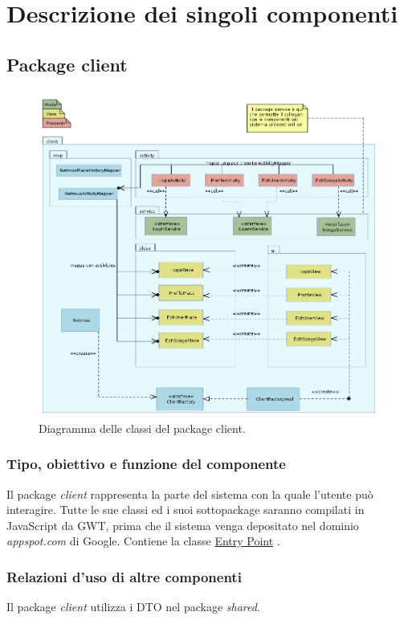 \chapter{Descrizione dei singoli componenti}
\section{Package client}
\begin{figure}[h]
  \centering
  \includegraphics[width=16.5cm]{img/ST/client.png}
\caption{Diagramma delle classi del package client.}
\end{figure}

\newpage
\subsection*{Tipo, obiettivo e funzione del componente} %
Il package \emph{client} rappresenta la parte del sistema con la quale l'utente
pu\`o interagire. Tutte le sue classi ed i suoi sottopackage saranno compilati in
JavaScript da GWT, prima che il sistema venga depositato nel dominio
\emph{appspot.com} di Google. Contiene la classe \underline{Entry Point}
.

\subsection*{Relazioni d'uso di altre componenti}
Il package \emph{client} utilizza i DTO nel package \emph{shared}.

